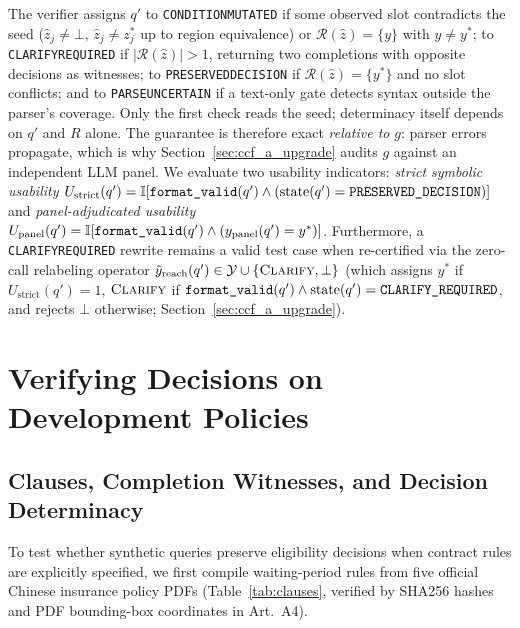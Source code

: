 \documentclass[10pt,twocolumn]{article}
\renewcommand{\_}{\textunderscore\allowbreak}
\begin{document}
The verifier assigns $q'$ to \texttt{CONDITION\_MUTATED} if some observed slot contradicts the seed ($\hat z_j \ne \bot$, $\hat z_j \ne z^\ast_j$ up to region equivalence) or $\mathcal{R}(\hat z) = \{y\}$ with $y \ne y^\ast$; to \texttt{CLARIFY\_REQUIRED} if $|\mathcal{R}(\hat z)| > 1$, returning two completions with opposite decisions as witnesses; to \texttt{PRESERVED\_DECISION} if $\mathcal{R}(\hat z) = \{y^\ast\}$ and no slot conflicts; and to \texttt{PARSE\_UNCERTAIN} if a text-only gate detects syntax outside the parser's coverage. Only the first check reads the seed; determinacy itself depends on $q'$ and $R$ alone. The guarantee is therefore exact \emph{relative to} $g$: parser errors propagate, which is why Section~\ref{sec:ccf_a_upgrade} audits $g$ against an independent LLM panel. We evaluate two usability indicators: \emph{strict symbolic usability} $U_{\text{strict}}(q') = \mathbb{I}[\texttt{format\_valid}(q') \wedge (\text{state}(q') = \texttt{PRESERVED\_DECISION})]$ and \emph{panel-adjudicated usability} $U_{\text{panel}}(q') = \mathbb{I}[\texttt{format\_valid}(q') \wedge (y_{\text{panel}}(q') = y^\ast)]$. Furthermore, a \texttt{CLARIFY\_REQUIRED} rewrite remains a valid test case when re-certified via the zero-call relabeling operator $\tilde{y}_{\text{reach}}(q') \in \mathcal{Y} \cup \{\textsc{Clarify}, \bot\}$ (which assigns $y^\ast$ if $U_{\text{strict}}(q')=1$, $\textsc{Clarify}$ if $\texttt{format\_valid}(q') \wedge \text{state}(q')=\texttt{CLARIFY\_REQUIRED}$, and rejects $\bot$ otherwise; Section~\ref{sec:ccf_a_upgrade}).

\section{Verifying Decisions on Development Policies}
\label{sec:dev_policies}

\subsection{Clauses, Completion Witnesses, and Decision Determinacy}
To test whether synthetic queries preserve eligibility decisions when contract rules are explicitly specified, we first compile waiting-period rules from five official Chinese insurance policy PDFs (Table~\ref{tab:clauses}, verified by SHA256 hashes and PDF bounding-box coordinates in Art.~A4).
\end{document}
